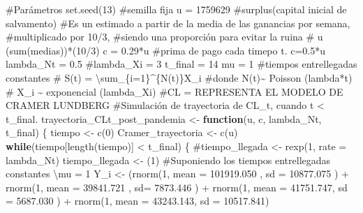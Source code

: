 \documentclass[
  us-letterpaper,
]{scrreprt}
\newenvironment{Shaded}{\begin{snugshade}}{\end{snugshade}}
\newcommand{\AttributeTok}[1]{\textcolor[rgb]{0.40,0.45,0.13}{#1}}
\newcommand{\CommentTok}[1]{\textcolor[rgb]{0.37,0.37,0.37}{#1}}
\newcommand{\ControlFlowTok}[1]{\textcolor[rgb]{0.00,0.23,0.31}{\textbf{#1}}}
\newcommand{\DecValTok}[1]{\textcolor[rgb]{0.68,0.00,0.00}{#1}}
\newcommand{\FloatTok}[1]{\textcolor[rgb]{0.68,0.00,0.00}{#1}}
\newcommand{\FunctionTok}[1]{\textcolor[rgb]{0.28,0.35,0.67}{#1}}
\newcommand{\NormalTok}[1]{\textcolor[rgb]{0.00,0.23,0.31}{#1}}
\newcommand{\OtherTok}[1]{\textcolor[rgb]{0.00,0.23,0.31}{#1}}
\newcommand{\SpecialCharTok}[1]{\textcolor[rgb]{0.37,0.37,0.37}{#1}}
\theoremstyle{definition}
\theoremstyle{plain}
\theoremstyle{plain}
\theoremstyle{remark}
\begin{document}
\begin{Shaded}
\begin{Highlighting}[]
\CommentTok{\#Parámetros}
\FunctionTok{set.seed}\NormalTok{(}\DecValTok{13}\NormalTok{) }\CommentTok{\#semilla fija}
\NormalTok{u }\OtherTok{=} \DecValTok{1759629} \CommentTok{\#surplus(capital inicial de salvamento)}
\CommentTok{\#Es un estimado a partir de la media de las ganancias por semana, }
\CommentTok{\#multiplicado por 10/3, }
\CommentTok{\#siendo una proporción para evitar la ruina}
\CommentTok{\# u (sum(medias))*(10/3)}
\NormalTok{c }\OtherTok{=} \FloatTok{0.29}\SpecialCharTok{*}\NormalTok{u }\CommentTok{\#prima de pago cada timepo t. c=0.5*u}
\NormalTok{lambda\_Nt }\OtherTok{=} \FloatTok{0.5}
\CommentTok{\#lambda\_Xi = 3}
\NormalTok{t\_final }\OtherTok{=} \DecValTok{14}
\NormalTok{mu }\OtherTok{=} \DecValTok{1} \CommentTok{\#tiempos entrellegadas constantes}
\CommentTok{\# S(t) = \textbackslash{}sum\_\{i=1\}\^{}\{N(t)\}X\_i}
\CommentTok{\#donde N(t)\textasciitilde{} Poisson (lambda*t)}
\CommentTok{\# X\_i \textasciitilde{} exponencial (lambda\_Xi)}
\CommentTok{\#CL = REPRESENTA EL MODELO DE CRAMER LUNDBERG}
\CommentTok{\#Simulación de trayectoria de CL\_t, cuando t \textless{} t\_final.}
\NormalTok{trayectoria\_CLt\_post\_pandemia }\OtherTok{\textless{}{-}} \ControlFlowTok{function}\NormalTok{(u, c, lambda\_Nt, t\_final)}
\NormalTok{\{}
\NormalTok{  tiempo }\OtherTok{\textless{}{-}} \FunctionTok{c}\NormalTok{(}\DecValTok{0}\NormalTok{)}
\NormalTok{  Cramer\_trayectoria }\OtherTok{\textless{}{-}} \FunctionTok{c}\NormalTok{(u)}
  \ControlFlowTok{while}\NormalTok{(tiempo[}\FunctionTok{length}\NormalTok{(tiempo)] }\SpecialCharTok{\textless{}}\NormalTok{ t\_final)}
\NormalTok{  \{}
    \CommentTok{\#tiempo\_llegada \textless{}{-} rexp(1, rate = lambda\_Nt)}
\NormalTok{    tiempo\_llegada }\OtherTok{\textless{}{-}}\NormalTok{ (}\DecValTok{1}\NormalTok{) }
\CommentTok{\#Suponiendo los tiempos entrellegadas constantes \textbackslash{}mu = 1}
\NormalTok{    Y\_i }\OtherTok{\textless{}{-}}\NormalTok{  (}\FunctionTok{rnorm}\NormalTok{(}\DecValTok{1}\NormalTok{, }\AttributeTok{mean =} \FloatTok{101919.050}\NormalTok{ , }\AttributeTok{sd =} \FloatTok{10877.075}\NormalTok{   ) }
              \SpecialCharTok{+} \FunctionTok{rnorm}\NormalTok{(}\DecValTok{1}\NormalTok{, }\AttributeTok{mean =}  \FloatTok{39841.721}\NormalTok{ , }\AttributeTok{sd=} \FloatTok{7873.446}\NormalTok{  ) }
              \SpecialCharTok{+} \FunctionTok{rnorm}\NormalTok{(}\DecValTok{1}\NormalTok{, }\AttributeTok{mean =}   \FloatTok{41751.747}\NormalTok{, }\AttributeTok{sd =} \FloatTok{5687.030}\NormalTok{ ) }
              \SpecialCharTok{+} \FunctionTok{rnorm}\NormalTok{(}\DecValTok{1}\NormalTok{, }\AttributeTok{mean =}   \FloatTok{43243.143}\NormalTok{, }\AttributeTok{sd =} \FloatTok{10517.841}\NormalTok{) }

\end{Highlighting}
\end{Shaded}
\end{document}
